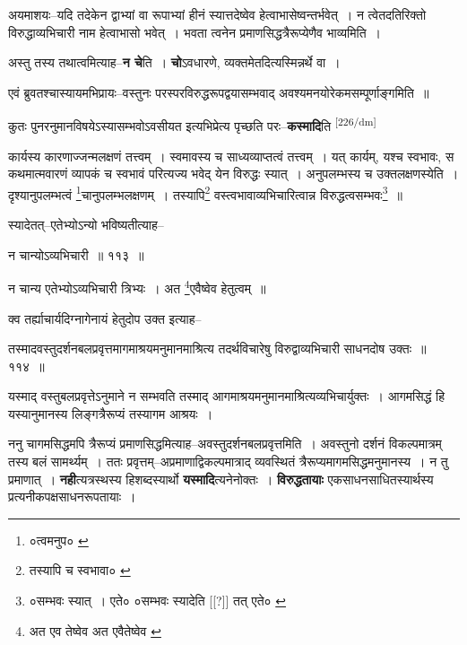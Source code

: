 \documentclass[article,12pt,a4paper]{memoir}
\begin{document}
	  \pstart अयमाशयः--यदि तदेकेन द्वाभ्यां वा रूपाभ्यां हीनं स्यात्तदेष्वेव हेत्वाभासेष्वन्तर्भवेत् । न त्वेतदतिरिक्तो विरुद्धाव्यभिचारी नाम हेत्वाभासो भवेत् । भवता त्वनेन प्रमाणसिद्धत्रैरूप्येणैव भाव्यमिति ।
	\pend
      

	  \pstart अस्तु तस्य तथात्वमित्याह--\textbf{न चे}ति । \textbf{चो}ऽवधारणे, व्यक्तमेतदित्यस्मिन्नर्थे वा ।
	\pend
      

	  \pstart एवं ब्रुवतश्चास्यायमभिप्रायः--वस्तुनः परस्परविरुद्धरूपद्वयासम्भवाद् अवश्यमनयोरेकमसम्पूर्णाङ्गमिति ॥
	\pend
      

	  \pstart कुतः पुनरनुमानविषयेऽस्यासम्भवोऽवसीयत इत्यभिप्रेत्य पृच्छति परः--\textbf{कस्मादि}ति  \leavevmode\textsuperscript{\rmlatinfont\tiny [226/dm]} 
	  
	कार्यस्य कारणाज्जन्मलक्षणं तत्त्वम् । स्वमावस्य च साध्यव्याप्तत्वं तत्त्वम् । यत् कार्यम्, यश्च स्वभावः, स कथमात्मवारणं व्यापकं च स्वभावं परित्यज्य भवेद् येन विरुद्धः स्यात् । अनुपलम्भस्य च उक्तलक्षणस्येति । दृश्यानुपलम्भत्वं \footnote{०त्वमनुप० \cite{dp-msA} \cite{dp-msB} \cite{dp-msC} \cite{dp-edP} \cite{dp-edH} \cite{dp-edE} \cite{dp-edN}}चानुपलम्भलक्षणम् । तस्यापि\footnote{तस्यापि च स्वभावा० \cite{dp-msA} \cite{dp-msB} \cite{dp-edP} \cite{dp-edH}} वस्त्वभावाव्यभिचारित्वान्न विरुद्धत्वसम्भवः\footnote{०सम्भवः स्यात् । एते० \cite{dp-msA} \cite{dp-edP} \cite{dp-edH} ०सम्भवः स्यादेति [[?]] तत् एते० \cite{dp-msB}} ॥ 
	  
	स्यादेतत्--एतेभ्योऽन्यो भविष्यतीत्याह-- 
	  
	न चान्योऽव्यभिचारी ॥ ११३ ॥ 
	  
	न चान्य एतेभ्योऽव्यभिचारी त्रिभ्यः । अत \footnote{अत एव तेष्वेव \cite{dp-msA} \cite{dp-msB} \cite{dp-edP} \cite{dp-edH} \cite{dp-edE} \cite{dp-edN} अत एवैतेष्वेव \cite{dp-msC}}एवैष्वेव हेतुत्वम् ॥ 
	  
	क्व तर्ह्याचार्यदिग्नागेनायं हेतुदोप उक्त इत्याह-- 
	  
	तस्मादवस्तुदर्शनबलप्रवृत्तमागमाश्रयमनुमानमाश्रित्य तदर्थविचारेषु विरुद्वाव्यभिचारी साधनदोष उक्तः ॥ ११४ ॥ 
	  
	यस्माद् वस्तुबलप्रवृत्तेऽनुमाने न सम्भवति तस्माद् आगमाश्रयमनुमानमाश्रित्यव्यभिचार्युक्तः । आगमसिद्धं हि यस्यानुमानस्य लिङ्गत्रैरूप्यं तस्यागम आश्रयः । 
	  
	ननु चागमसिद्धमपि त्रैरूप्यं प्रमाणसिद्धमित्याह--अवस्तुदर्शनबलप्रवृत्तमिति । अवस्तुनो दर्शनं विकल्पमात्रम् तस्य बलं सामर्थ्यम् । ततः प्रवृत्तम्--अप्रमाणाद्विकल्पमात्राद् व्यवस्थितं त्रैरूप्यमागमसिद्धमनुमानस्य । न तु प्रमाणात् । \textbf{नही}त्यत्रस्थस्य हिशब्दस्यार्थो \textbf{यस्मादि}त्यनेनोक्तः । \textbf{विरुद्धतायाः} एकसाधनसाधितस्यार्थस्य प्रत्यनीकपक्षसाधनरूपतायाः ।
	\pend
      
\end{document}
